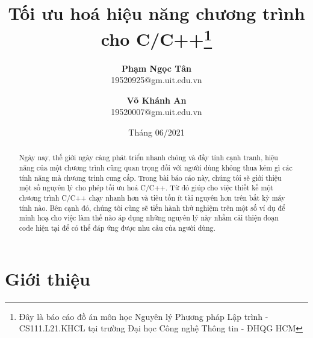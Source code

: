 \documentclass{article}
\title{\textbf{Tối ưu hoá hiệu năng chương trình cho C/C++\footnote[1]{Đây là báo cáo đồ án môn học Nguyên lý Phương pháp Lập trình - CS111.L21.KHCL tại trường Đại học Công nghệ Thông tin - ĐHQG HCM}}}
\author{
  \textbf{Phạm Ngọc Tân\footnotemark[2]}\\
  \small 19520925@gm.uit.edu.vn
  \and
  \textbf{Võ Khánh An\footnotemark[2]}\\
  \small 19520007@gm.uit.edu.vn
  \footnotetext{khoa Khoa học máy tính, trường Đại học Công nghệ Thông tin - ĐHQG HCM}}
\date{Tháng 06/2021}
\begin{document}
\maketitle

\begin{abstract}
\justifying 
\noindent 
    Ngày nay, thế giới ngày càng phát triển nhanh chóng và đầy tính cạnh tranh, hiệu năng của một chương trình cũng quan trọng đối với người dùng không thua kém gì các tính năng mà chương trình cung cấp. Trong bài báo cáo này, chúng tôi sẽ giới thiệu một số nguyên lý cho phép tối ưu hoá C/C++. Từ đó giúp cho việc thiết kế một chương trình C/C++ chạy nhanh hơn và tiêu tốn ít tài nguyên hơn trên bất kỳ máy tính nào. Bên cạnh đó, chúng tôi cũng sẽ tiến hành thử nghiệm trên một số ví dụ để minh hoạ cho việc làm thế nào áp dụng những nguyên lý này nhằm cải thiện đoạn code hiện tại để có thể đáp ứng được nhu cầu của người dùng.
\end{abstract}


\section{Giới thiệu}
\end{document}
